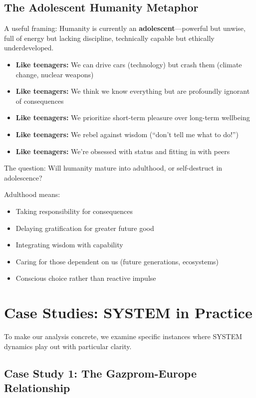 \documentclass[11pt,a4paper]{article}
\theoremstyle{definition}
\theoremstyle{remark}
\begin{document}
\subsection{The Adolescent Humanity Metaphor}

A useful framing: Humanity is currently an \textbf{adolescent}---powerful but unwise, full of energy but lacking discipline, technically capable but ethically underdeveloped.

\begin{itemize}
    \item \textbf{Like teenagers:} We can drive cars (technology) but crash them (climate change, nuclear weapons)
    \item \textbf{Like teenagers:} We think we know everything but are profoundly ignorant of consequences
    \item \textbf{Like teenagers:} We prioritize short-term pleasure over long-term wellbeing
    \item \textbf{Like teenagers:} We rebel against wisdom (``don't tell me what to do!'')
    \item \textbf{Like teenagers:} We're obsessed with status and fitting in with peers
\end{itemize}

The question: Will humanity mature into adulthood, or self-destruct in adolescence?

Adulthood means:
\begin{itemize}
    \item Taking responsibility for consequences
    \item Delaying gratification for greater future good
    \item Integrating wisdom with capability
    \item Caring for those dependent on us (future generations, ecosystems)
    \item Conscious choice rather than reactive impulse
\end{itemize}

\section{Case Studies: SYSTEM in Practice}

To make our analysis concrete, we examine specific instances where SYSTEM dynamics play out with particular clarity.

\subsection{Case Study 1: The Gazprom-Europe Relationship}
\end{document}
